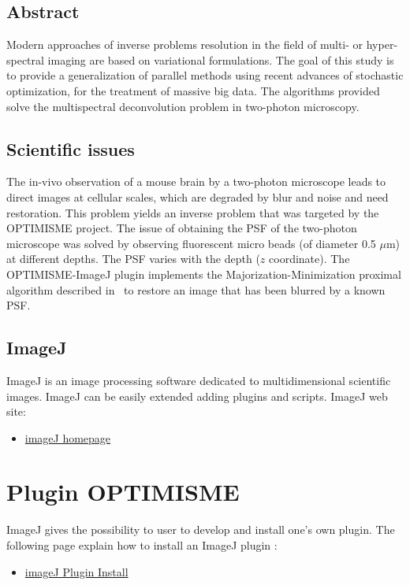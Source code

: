 \documentclass[12pt, a4paper]{scrartcl}
\begin{document}
\subsection{Abstract}
Modern approaches of inverse problems resolution in the field of multi- or hyper-spectral imaging are based on variational formulations.
The goal of this study is to provide a generalization of parallel methods using recent 
advances of stochastic optimization, for the treatment of massive big data.
The  algorithms provided solve the multispectral deconvolution problem in two-photon microscopy.

\subsection{Scientific issues}
The in-vivo observation of a mouse brain by a two-photon microscope leads to direct images at cellular scales, which are degraded by blur and noise and need restoration.
This problem yields an inverse problem that was targeted by the OPTIMISME project.
The issue of obtaining the PSF of the two-photon microscope was solved by observing fluorescent micro beads (of diameter 0.5 $\mu$m) at different depths. The PSF varies with the depth ($z$ coordinate).
The OPTIMISME-ImageJ plugin implements the Majorization-Minimization proximal algorithm described in~\cite{chouzenoux:hal-01278102} to restore an image that has been blurred by a known PSF.

\subsection{ImageJ}
ImageJ is an image processing software dedicated to multidimensional scientific images.
ImageJ can be easily extended adding plugins and scripts.
ImageJ web site:
\begin{itemize}
\item 
\href {http://imagej.net/Welcome}{imageJ homepage}
\end{itemize} 


\section{Plugin OPTIMISME}

ImageJ gives the possibility to user to develop and install one's own plugin. The following page explain how to install an ImageJ plugin :
\begin{itemize}
\item 
\href  {http://imagejdocu.tudor.lu/doku.php?id=howto:plugins:how\_to_install\_a\_plugin} {imageJ Plugin Install}
\end{itemize} 
\end{document}
